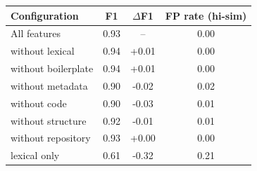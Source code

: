 \begin{tabular}{lccc}
\toprule
Configuration & F1 & $\Delta$F1 & FP rate (hi-sim) \\
\midrule
All features & 0.93 & -- & 0.00 \\
without lexical & 0.94 & +0.01 & 0.00 \\
without boilerplate & 0.94 & +0.01 & 0.00 \\
without metadata & 0.90 & -0.02 & 0.02 \\
without code & 0.90 & -0.03 & 0.01 \\
without structure & 0.92 & -0.01 & 0.01 \\
without repository & 0.93 & +0.00 & 0.00 \\
lexical only & 0.61 & -0.32 & 0.21 \\
\bottomrule
\end{tabular}
